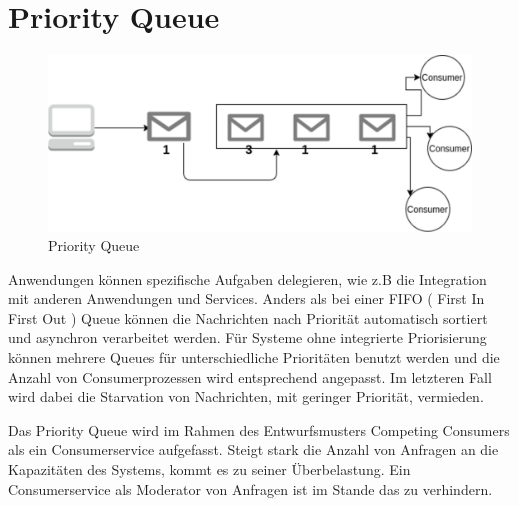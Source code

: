 \documentclass[
12pt,
english,
ngerman,
headsepline,
twoside,
openright,
numbers=noenddot,version=first
]{scrreprt}
\begin{document}
\section{Priority Queue}\label{sec:priority-queue}
\begin{figure}[H]
	\centering
	\includegraphics[scale=0.60]{./pics/pattern-priority-queue.eps}
	\caption{Priority Queue}
	\label{pic:priority-queue}
\end{figure}
Anwendungen können spezifische Aufgaben delegieren, wie z.B die Integration mit anderen Anwendungen und Services. Anders als bei einer FIFO  ( First In First Out ) Queue können die Nachrichten nach Priorität automatisch sortiert und asynchron verarbeitet werden. Für Systeme ohne integrierte Priorisierung können mehrere Queues für unterschiedliche Prioritäten benutzt werden und die Anzahl von Consumerprozessen wird entsprechend angepasst. Im letzteren Fall wird dabei die Starvation von Nachrichten, mit geringer Priorität, vermieden.

Das Priority Queue wird im Rahmen des Entwurfsmusters Competing Consumers als ein Consumerservice aufgefasst. Steigt stark die Anzahl von Anfragen an die Kapazitäten des Systems, kommt es zu seiner Überbelastung. Ein Consumerservice als Moderator von Anfragen ist im Stande das zu verhindern.
\end{document}
